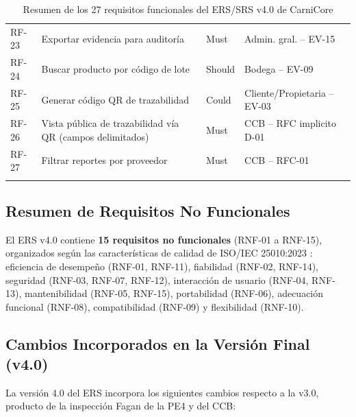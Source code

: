 \documentclass[11pt,a4paper]{article}
\begin{document}
\begin{longtable}{|p{1.2cm}|p{5.5cm}|p{1.8cm}|p{4.5cm}|}
RF-23 & Exportar evidencia para auditoría & Must & Admin. gral. -- EV-15 \\
RF-24 & Buscar producto por código de lote & Should & Bodega -- EV-09 \\
RF-25 & Generar código QR de trazabilidad & Could & Cliente/Propietaria -- EV-03 \\
RF-26 & Vista pública de trazabilidad vía QR (campos delimitados) & Must & CCB -- RFC implicito D-01 \\
RF-27 & Filtrar reportes por proveedor & Must & CCB -- RFC-01 \\
\hline
\caption{Resumen de los 27 requisitos funcionales del ERS/SRS v4.0 de CarniCore}
\label{tab:rf_resumen}
\end{longtable}

\subsection{Resumen de Requisitos No Funcionales}

El ERS v4.0 contiene \textbf{15 requisitos no funcionales} (RNF-01 a RNF-15), organizados según las características de calidad de ISO/IEC 25010:2023 \cite{iso25010}: eficiencia de desempeño (RNF-01, RNF-11), fiabilidad (RNF-02, RNF-14), seguridad (RNF-03, RNF-07, RNF-12), interacción de usuario (RNF-04, RNF-13), mantenibilidad (RNF-05, RNF-15), portabilidad (RNF-06), adecuación funcional (RNF-08), compatibilidad (RNF-09) y flexibilidad (RNF-10).

\subsection{Cambios Incorporados en la Versión Final (v4.0)}

La versión 4.0 del ERS incorpora los siguientes cambios respecto a la v3.0, producto de la inspección Fagan de la PE4 y del CCB:
\end{document}
